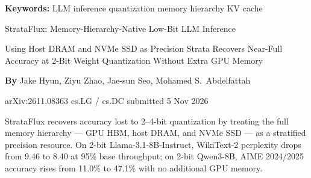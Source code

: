 \documentclass[10pt,twocolumn]{article}
\begin{document}
\setlength{\parindent}{0pt}
\setlength{\parskip}{4pt}

{\small\color{keywordgray}\textbf{Keywords:}
  LLM inference \textbullet{}
  quantization \textbullet{}
  memory hierarchy \textbullet{}
  KV cache}\par\vspace{4pt}

{\LARGE\bfseries\raggedright
  StrataFlux: Memory-Hierarchy-Native Low-Bit LLM Inference}\par\vspace{4pt}

{\large\itshape\raggedright
  Using Host DRAM and NVMe SSD as Precision Strata Recovers Near-Full
  Accuracy at 2-Bit Weight Quantization Without Extra GPU Memory}\par\vspace{6pt}

{\small\textbf{By} Jake Hyun, Ziyu Zhao, Jae-sun Seo, Mohamed S.\ Abdelfattah}\par\vspace{2pt}

{\small\color{keywordgray}arXiv:2611.08363 \textbullet{}
  cs.LG / cs.DC \textbullet{} submitted 5 Nov 2026}
\par\vspace{2pt}\noindent{\color{rulered}\rule{\columnwidth}{0.6pt}}\vspace{6pt}

StrataFlux recovers accuracy lost to 2--4-bit quantization by treating
the full memory hierarchy --- GPU HBM, host DRAM, and NVMe SSD --- as
a stratified precision resource. On 2-bit Llama-3.1-8B-Instruct,
WikiText-2 perplexity drops from 9.46 to 8.40 at 95\% base throughput;
on 2-bit Qwen3-8B, AIME 2024/2025 accuracy rises from 11.0\% to 47.1\%
with no additional GPU memory.
\end{document}
